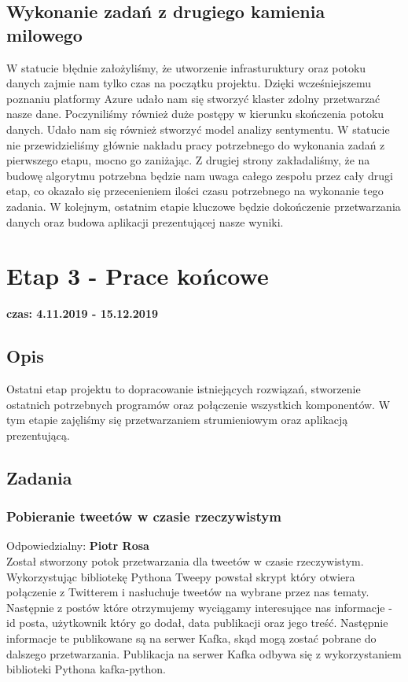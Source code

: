 \documentclass[a4paper,11pt, notitlepage ]{article}
\begin{document}
\subsection{Wykonanie zadań z drugiego kamienia milowego}
W statucie błędnie założyliśmy, że utworzenie infrasturuktury oraz potoku danych zajmie nam tylko czas na początku projektu. Dzięki wcześniejszemu poznaniu platformy Azure udało nam się stworzyć klaster zdolny przetwarzać nasze dane. Poczyniliśmy również duże postępy w kierunku skończenia potoku danych. Udało nam się również stworzyć model analizy sentymentu. W statucie nie przewidzieliśmy głównie nakładu pracy potrzebnego do wykonania zadań z pierwszego etapu, mocno go zaniżając. Z drugiej strony zakładaliśmy, że na budowę algorytmu potrzebna będzie nam uwaga całego zespołu przez cały drugi etap, co okazało się przecenieniem ilości czasu potrzebnego na wykonanie tego zadania. W kolejnym, ostatnim etapie kluczowe będzie dokończenie przetwarzania danych oraz budowa aplikacji prezentującej nasze wyniki.

\section{Etap 3 - Prace końcowe}
\textbf{czas: 4.11.2019 - 15.12.2019}
\subsection{Opis}
Ostatni etap projektu to dopracowanie istniejących rozwiązań, stworzenie ostatnich potrzebnych programów oraz połączenie wszystkich komponentów. W tym etapie zajęliśmy się przetwarzaniem strumieniowym oraz aplikacją prezentującą.
\subsection{Zadania}
    \subsubsection{Pobieranie tweetów w czasie rzeczywistym}
    Odpowiedzialny: \textbf{Piotr Rosa}\\
    Został stworzony potok przetwarzania dla tweetów w czasie rzeczywistym. 
    Wykorzystując bibliotekę Pythona Tweepy powstał skrypt który otwiera połączenie z Twitterem i nasłuchuje tweetów na wybrane przez nas tematy. Następnie z postów które otrzymujemy wyciągamy interesujące nas informacje - id posta, użytkownik który go dodał, data publikacji oraz jego treść. Następnie informacje te publikowane są na serwer Kafka, skąd mogą zostać pobrane do dalszego przetwarzania. Publikacja na serwer Kafka odbywa się z wykorzystaniem biblioteki Pythona kafka-python.
    
\end{document}
